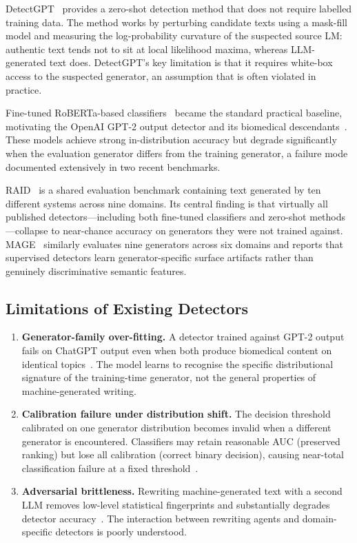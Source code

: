 \documentclass[12pt,a4paper]{article}
\begin{document}
DetectGPT~\cite{mitchell2023detectgpt} provides a zero-shot detection method
that does not require labelled training data. The method works by
perturbing candidate texts using a mask-fill model and measuring the
log-probability curvature of the suspected source LM: authentic text tends
not to sit at local likelihood maxima, whereas LLM-generated text does.
DetectGPT's key limitation is that it requires white-box access to the
suspected generator, an assumption that is often violated in practice.

Fine-tuned RoBERTa-based classifiers~\cite{solaiman2019releasestrategies}
became the standard practical baseline, motivating the OpenAI GPT-2 output
detector and its biomedical descendants~\cite{liang2023gptdetect}. These
models achieve strong in-distribution accuracy but degrade significantly
when the evaluation generator differs from the training generator, a failure
mode documented extensively in two recent benchmarks.

RAID~\cite{dugan2024raid} is a shared evaluation benchmark containing text
generated by ten different systems across nine domains. Its central finding
is that virtually all published detectors—including both fine-tuned
classifiers and zero-shot methods—collapse to near-chance accuracy on
generators they were not trained against. MAGE~\cite{li2024mage} similarly
evaluates nine generators across six domains and reports that supervised
detectors learn generator-specific surface artifacts rather than genuinely
discriminative semantic features.

\subsection{Limitations of Existing Detectors}

\begin{enumerate}
    \item \textbf{Generator-family over-fitting.} A detector trained against
          GPT-2 output fails on ChatGPT output even when both produce
          biomedical content on identical topics~\cite{dugan2024raid,li2024mage}.
          The model learns to recognise the specific distributional signature
          of the training-time generator, not the general properties of
          machine-generated writing.
    \item \textbf{Calibration failure under distribution shift.} The
          decision threshold calibrated on one generator distribution
          becomes invalid when a different generator is encountered.
          Classifiers may retain reasonable AUC (preserved ranking) but
          lose all calibration (correct binary decision), causing near-total
          classification failure at a fixed threshold~\cite{dugan2024raid}.
    \item \textbf{Adversarial brittleness.} Rewriting machine-generated
          text with a second LLM removes low-level statistical fingerprints
          and substantially degrades detector accuracy~\cite{krishna2023paraphrasing,
          sadasivan2024aigeneratedtext}. The interaction between rewriting
          agents and domain-specific detectors is poorly understood.
\end{enumerate}
\end{document}
